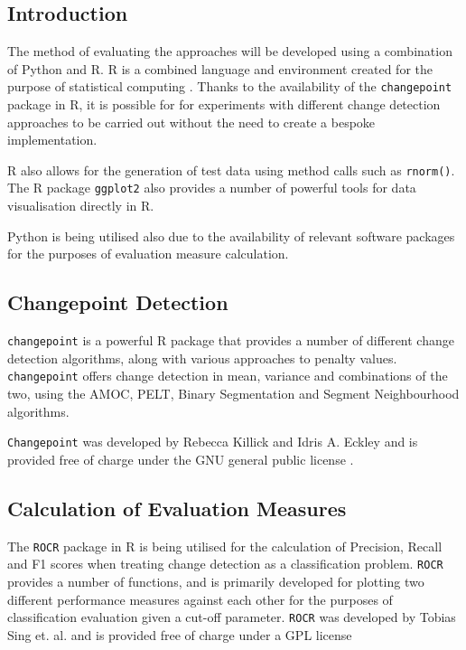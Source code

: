 \documentclass{uvamscse}	%
\begin{document}
\subsection{Introduction}

The method of evaluating the approaches will be developed using a combination of Python and \textsf{R}. \textsf{R} is a combined language and environment created for the purpose of statistical computing \cite{RCoreTeam2017}. Thanks to the availability of the \texttt{changepoint} package in \textsf{R}\cite{Killick2014}, it is possible for for experiments with different change detection approaches to be carried out without the need to create a bespoke implementation.

\textsf{R} also allows for the generation of test data using method calls such as \texttt{rnorm()}. The \textsf{R} package \texttt{ggplot2} \cite{Wickham2009} also provides a number of powerful tools for data visualisation directly in \textsf{R}.

Python is being utilised also due to the availability of relevant software packages for the purposes of evaluation measure calculation.

\subsection{Changepoint Detection}

\texttt{changepoint} is a powerful R package that provides a number of different change detection algorithms, along with various approaches to penalty values. \texttt{changepoint} offers change detection in mean, variance and combinations of the two, using the AMOC, PELT, Binary Segmentation and Segment Neighbourhood algorithms.

\texttt{Changepoint} was developed by Rebecca Killick and Idris A. Eckley and is provided free of charge under the GNU general public license \cite{Killick2014}.

\subsection{Calculation of Evaluation Measures}

The \texttt{ROCR} package in \textsf{R} is being utilised for the calculation of Precision, Recall and F1 scores when treating change detection as a classification problem. \texttt{ROCR} provides a number of functions, and is primarily developed for plotting two different performance measures against each other for the purposes of classification evaluation given a cut-off parameter. \texttt{ROCR} was developed by Tobias Sing et. al. and is provided free of charge under a GPL license
\end{document}
